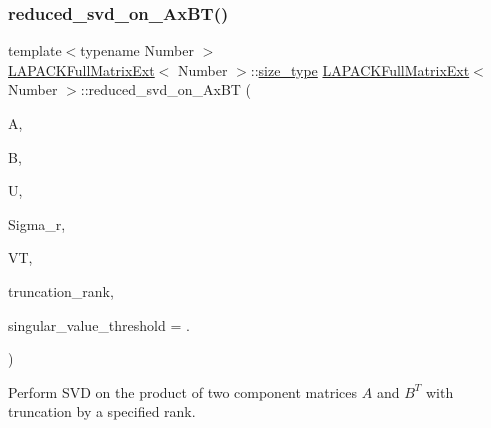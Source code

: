 \mbox{\label{classLAPACKFullMatrixExt_a56dbf804ab7f3ffb3ed3a09d5b4e5170}} 
\subsubsection{\texorpdfstring{reduced\+\_\+svd\+\_\+on\+\_\+\+Ax\+B\+T()}{reduced\_svd\_on\_AxBT()}\hspace{0.1cm}{\footnotesize\ttfamily [2/2]}}
{\footnotesize\ttfamily template$<$typename Number $>$ \\
\hyperlink{classLAPACKFullMatrixExt}{L\+A\+P\+A\+C\+K\+Full\+Matrix\+Ext}$<$ Number $>$\+::\hyperlink{classLAPACKFullMatrixExt_a5cf5f4a6104dc17029210b5ca52bf574}{size\+\_\+type} \hyperlink{classLAPACKFullMatrixExt}{L\+A\+P\+A\+C\+K\+Full\+Matrix\+Ext}$<$ Number $>$\+::reduced\+\_\+svd\+\_\+on\+\_\+\+Ax\+BT (\begin{DoxyParamCaption}\item[{\hyperlink{classLAPACKFullMatrixExt}{L\+A\+P\+A\+C\+K\+Full\+Matrix\+Ext}$<$ Number $>$ \&}]{A,  }\item[{\hyperlink{classLAPACKFullMatrixExt}{L\+A\+P\+A\+C\+K\+Full\+Matrix\+Ext}$<$ Number $>$ \&}]{B,  }\item[{\hyperlink{classLAPACKFullMatrixExt}{L\+A\+P\+A\+C\+K\+Full\+Matrix\+Ext}$<$ Number $>$ \&}]{U,  }\item[{std\+::vector$<$ typename numbers\+::\+Number\+Traits$<$ Number $>$\+::real\+\_\+type $>$ \&}]{Sigma\+\_\+r,  }\item[{\hyperlink{classLAPACKFullMatrixExt}{L\+A\+P\+A\+C\+K\+Full\+Matrix\+Ext}$<$ Number $>$ \&}]{VT,  }\item[{\hyperlink{classLAPACKFullMatrixExt_a5cf5f4a6104dc17029210b5ca52bf574}{size\+\_\+type}}]{truncation\+\_\+rank,  }\item[{Number}]{singular\+\_\+value\+\_\+threshold = {.} }\end{DoxyParamCaption})\hspace{0.3cm}{\ttfamily [static]}}

Perform S\+VD on the product of two component matrices $A$ and $B^T$ with truncation by a specified rank.

